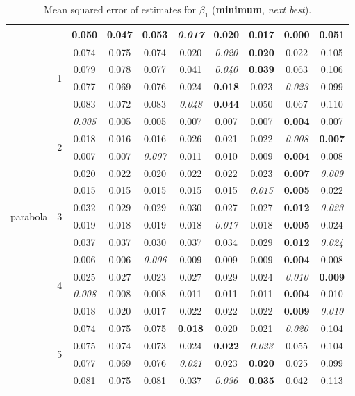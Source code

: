 \documentclass[authoryear, review, 11pt]{elsarticle}
\begin{document}
\begin{table}
\begin{center}
{\begin{tabular}{cccccccccc}
		  &  & 0.050 & 0.047 & 0.053 & \emph{0.017} & 0.020 & 0.017 & \textbf{0.000} & 0.051 \\ 
		  \hline
		  \multirow{20}{*}{parabola} & \multirow{4}{*}{1} & 0.074 & 0.075 & 0.074 & 0.020 & \emph{0.020} & \textbf{0.020} & 0.022 & 0.105 \\ 
		  &  & 0.079 & 0.078 & 0.077 & 0.041 & \emph{0.040} & \textbf{0.039} & 0.063 & 0.106 \\ 
		  &  & 0.077 & 0.069 & 0.076 & 0.024 & \textbf{0.018} & 0.023 & \emph{0.023} & 0.099 \\ 
		  &  & 0.083 & 0.072 & 0.083 & \emph{0.048} & \textbf{0.044} & 0.050 & 0.067 & 0.110 \\ 
		  \cline{3-10}
		  & \multirow{4}{*}{2} & \emph{0.005} & 0.005 & 0.005 & 0.007 & 0.007 & 0.007 & \textbf{0.004} & 0.007 \\ 
		  &  & 0.018 & 0.016 & 0.016 & 0.026 & 0.021 & 0.022 & \emph{0.008} & \textbf{0.007} \\ 
		  &  & 0.007 & 0.007 & \emph{0.007} & 0.011 & 0.010 & 0.009 & \textbf{0.004} & 0.008 \\ 
		  &  & 0.020 & 0.022 & 0.020 & 0.022 & 0.022 & 0.023 & \textbf{0.007} & \emph{0.009} \\ 
		  \cline{3-10}
		  & \multirow{4}{*}{3} & 0.015 & 0.015 & 0.015 & 0.015 & 0.015 & \emph{0.015} & \textbf{0.005} & 0.022 \\ 
		  &  & 0.032 & 0.029 & 0.029 & 0.030 & 0.027 & 0.027 & \textbf{0.012} & \emph{0.023} \\ 
		  &  & 0.019 & 0.018 & 0.019 & 0.018 & \emph{0.017} & 0.018 & \textbf{0.005} & 0.024 \\ 
		  &  & 0.037 & 0.037 & 0.030 & 0.037 & 0.034 & 0.029 & \textbf{0.012} & \emph{0.024} \\ 
		  \cline{3-10}
		  & \multirow{4}{*}{4} & 0.006 & 0.006 & \emph{0.006} & 0.009 & 0.009 & 0.009 & \textbf{0.004} & 0.008 \\ 
		  &  & 0.025 & 0.027 & 0.023 & 0.027 & 0.029 & 0.024 & \emph{0.010} & \textbf{0.009} \\ 
		  &  & \emph{0.008} & 0.008 & 0.008 & 0.011 & 0.011 & 0.011 & \textbf{0.004} & 0.010 \\ 
		  &  & 0.018 & 0.020 & 0.017 & 0.022 & 0.022 & 0.022 & \textbf{0.009} & \emph{0.010} \\ 
		  \cline{3-10}
		  & \multirow{4}{*}{5} & 0.074 & 0.075 & 0.075 & \textbf{0.018} & 0.020 & 0.021 & \emph{0.020} & 0.104 \\ 
		  &  & 0.075 & 0.074 & 0.073 & 0.024 & \textbf{0.022} & \emph{0.023} & 0.055 & 0.104 \\ 
		  &  & 0.077 & 0.069 & 0.076 & \emph{0.021} & 0.023 & \textbf{0.020} & 0.025 & 0.099 \\ 
		  &  & 0.081 & 0.075 & 0.081 & 0.037 & \emph{0.036} & \textbf{0.035} & 0.042 & 0.113 \\
		\end{tabular}}
		\caption{Mean squared error of estimates for $\beta_1$ (\textbf{minimum}, \emph{next best}).\label{table:X1-MSEX}}
		\end{center}
		\end{table}	
 
\end{document}

